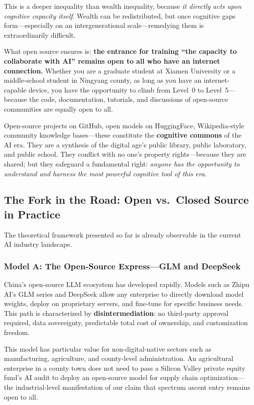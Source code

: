 ﻿\documentclass[12pt,a4paper]{article}
\begin{document}
This is a deeper inequality than wealth inequality, because \emph{it directly acts upon cognitive capacity itself}. Wealth can be redistributed, but once cognitive gaps form---especially on an intergenerational scale---remedying them is extraordinarily difficult.

What open source ensures is: \textbf{the entrance for training ``the capacity to collaborate with AI'' remains open to all who have an internet connection.} Whether you are a graduate student at Xiamen University or a middle-school student in Ningyang county, as long as you have an internet-capable device, you have the opportunity to climb from Level~0 to Level~5---because the code, documentation, tutorials, and discussions of open-source communities are equally open to all.

Open-source projects on GitHub, open models on HuggingFace, Wikipedia-style community knowledge bases---these constitute the \textbf{cognitive commons} of the AI era. They are a synthesis of the digital age's public library, public laboratory, and public school. They conflict with no one's property rights---because they are shared; but they safeguard a fundamental right: \emph{anyone has the opportunity to understand and harness the most powerful cognitive tool of this era.}

\subsection{The Fork in the Road: Open vs.\ Closed Source in Practice}

The theoretical framework presented so far is already observable in the current AI industry landscape.

\subsubsection{Model A: The Open-Source Express---GLM and DeepSeek}

China's open-source LLM ecosystem has developed rapidly. Models such as Zhipu AI's GLM series and DeepSeek allow any enterprise to directly download model weights, deploy on proprietary servers, and fine-tune for specific business needs. This path is characterized by \textbf{disintermediation}: no third-party approval required, data sovereignty, predictable total cost of ownership, and customization freedom.

This model has particular value for non-digital-native sectors such as manufacturing, agriculture, and county-level administration. An agricultural enterprise in a county town does not need to pass a Silicon Valley private equity fund's AI audit to deploy an open-source model for supply chain optimization---the industrial-level manifestation of our claim that spectrum ascent entry remains open to all.
\end{document}
